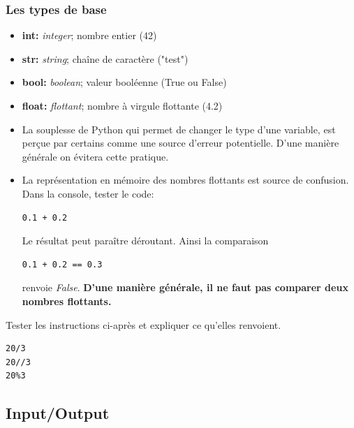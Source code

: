 \documentclass[a4paper,11pt]{article}
\begin{document}
\begin{Form}
\subsubsection{Les types de base}
\begin{itemize}
\item \textbf{int:} \emph{integer}; nombre entier (42)
\item \textbf{str:} \emph{string}; chaîne de caractère ("test")
\item \textbf{bool:} \emph{boolean}; valeur booléenne (True ou False)
\item \textbf{float:} \emph{flottant}; nombre à virgule flottante (4.2)
\end{itemize}
\begin{aretenir}
\begin{itemize}
\item La souplesse de Python qui permet de changer le type d'une variable, est perçue par certains comme une source d'erreur potentielle. D'une manière générale on évitera cette pratique.
\item La représentation en mémoire des nombres flottants est source de confusion. Dans la console, tester le code:
\begin{lstlisting}
0.1 + 0.2
\end{lstlisting}
Le résultat peut paraître déroutant. Ainsi la comparaison
\begin{lstlisting}
0.1 + 0.2 == 0.3
\end{lstlisting}
renvoie \emph{False}. \textbf{D'une manière générale, il ne faut pas comparer deux nombres flottants.}
\end{itemize}
\end{aretenir}
\begin{activite}
Tester les instructions ci-après et expliquer ce qu'elles renvoient.
\begin{lstlisting}
20/3
20//3
20%3
\end{lstlisting}
\end{activite}
\subsection{Input/Output}

\end{Form}
\end{document}
